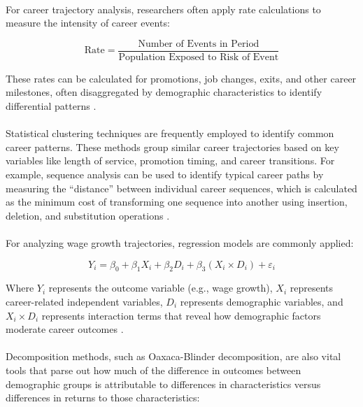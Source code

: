 \documentclass[../main.tex]{subfiles}
\begin{document}
\paragraph{} For career trajectory analysis, researchers often apply rate calculations to measure the intensity of career events:

\begin{equation}
\text{Rate} = \frac{\text{Number of Events in Period}}{\text{Population Exposed to Risk of Event}}
\end{equation}

These rates can be calculated for promotions, job changes, exits, and other career milestones, often disaggregated by demographic characteristics to identify differential patterns \citep{gale2024demographics, land2019mathematical}.

\paragraph{} Statistical clustering techniques are frequently employed to identify common career patterns. These methods group similar career trajectories based on key variables like length of service, promotion timing, and career transitions. For example, sequence analysis can be used to identify typical career paths by measuring the ``distance'' between individual career sequences, which is calculated as the minimum cost of transforming one sequence into another using insertion, deletion, and substitution operations \citep{nataraj2018career}.

\paragraph{} For analyzing wage growth trajectories, regression models are commonly applied:

\begin{equation}
Y_i = \beta_0 + \beta_1 X_i + \beta_2 D_i + \beta_3 (X_i \times D_i) + \varepsilon_i
\end{equation}

Where $Y_i$ represents the outcome variable (e.g., wage growth), $X_i$ represents career-related independent variables, $D_i$ represents demographic variables, and $X_i \times D_i$ represents interaction terms that reveal how demographic factors moderate career outcomes \citep{dol2023building, baker2023demographic}.

\paragraph{} Decomposition methods, such as Oaxaca-Blinder decomposition, are also vital tools that parse out how much of the difference in outcomes between demographic groups is attributable to differences in characteristics versus differences in returns to those characteristics:
\end{document}
